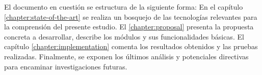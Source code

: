 El documento en cuesti\'on se estructura de la siguiente forma: En el cap\'itulo \ref{chapter:state-of-the-art} se realiza un bosquejo de las tecnolog\'ias relevantes para la comprensi\'on del presente estudio. El \ref{chapter:proposal} presenta la propuesta concreta a desarrollar, describe los m\'odulos y sus funcionalidades b\'asicas. El cap\'itulo \ref{chapter:implementation} comenta los resultados obtenidos y las pruebas realizadas. Finalmente, se exponen los \'ultimos an\'alisis y potenciales directivas para encaminar investigaciones futuras.



